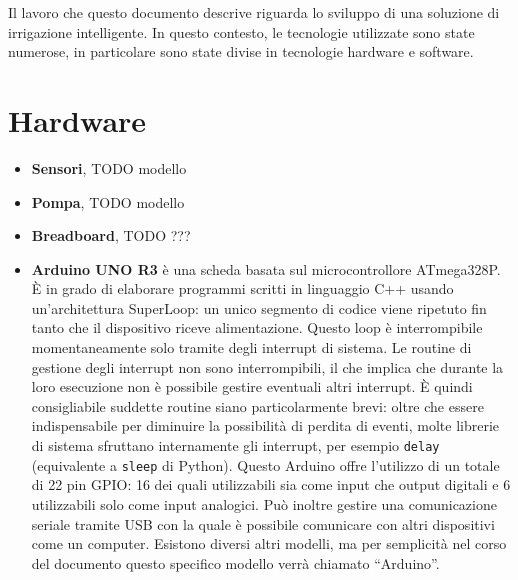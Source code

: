 \documentclass[12pt,a4paper,openright,twoside, openany]{book}
\begin{document}

Il lavoro che questo documento descrive riguarda lo sviluppo di una soluzione di irrigazione intelligente. In questo contesto, le tecnologie utilizzate sono state numerose, in particolare sono state divise in tecnologie hardware e software.

\section{Hardware}

\begin{itemize}[noitemsep]
    \item \textbf{Sensori}, TODO modello
    \item \textbf{Pompa}, TODO modello
    \item \textbf{Breadboard}, TODO ???
    \item \textbf{Arduino UNO R3} è una scheda basata sul microcontrollore ATmega328P. È in grado di elaborare programmi scritti in linguaggio C++ usando un'architettura SuperLoop: un unico segmento di codice viene ripetuto fin tanto che il dispositivo riceve alimentazione. Questo loop è interrompibile momentaneamente solo tramite degli interrupt di sistema. Le routine di gestione degli interrupt non sono interrompibili, il che implica che durante la loro esecuzione non è possibile gestire eventuali altri interrupt. È quindi consigliabile suddette routine siano particolarmente brevi: oltre che essere indispensabile per diminuire la possibilità di perdita di eventi, molte librerie di sistema sfruttano internamente gli interrupt, per esempio \texttt{delay} (equivalente a \texttt{sleep} di Python).
    Questo Arduino offre l'utilizzo di un totale di 22 pin \ac{GPIO}: 16 dei quali utilizzabili sia come input che output digitali e 6 utilizzabili solo come input analogici. Può inoltre gestire una comunicazione seriale tramite USB con la quale è possibile comunicare con altri dispositivi come un computer.
    Esistono diversi altri modelli, ma per semplicità nel corso del documento questo specifico modello verrà chiamato ``Arduino''.

\end{itemize}
\end{document}
